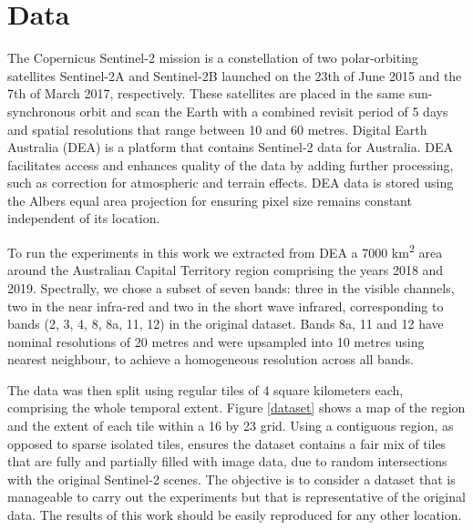 \documentclass[essd, manuscript]{copernicus}
\begin{document}
\section{Data}

The Copernicus Sentinel-2 mission \citep{drusch2012sentinel} is a constellation of two polar-orbiting satellites Sentinel-2A and Sentinel-2B launched on the 23th of June 2015 and the 7th of March 2017, respectively. These satellites are placed in the same sun-synchronous orbit and scan the Earth with a combined revisit period of 5 days and spatial resolutions that range between 10 and 60 metres. Digital Earth Australia (DEA) \citep{dhu2017digital} is a platform that contains Sentinel-2 data for Australia. DEA facilitates access and enhances quality of the data by adding further processing, such as correction for atmospheric and terrain effects. DEA data is stored using the Albers equal area projection for ensuring pixel size remains constant independent of its location.

To run the experiments in this work we extracted from DEA a 7000 km\textsuperscript{2} area around the Australian Capital Territory region comprising the years 2018 and 2019. Spectrally, we chose a subset of seven bands: three in the visible channels, two in the near infra-red and two in the short wave infrared, corresponding to bands (2, 3, 4, 8, 8a, 11, 12) in the original dataset. Bands 8a, 11 and 12 have nominal resolutions of 20 metres and were upsampled into 10 metres using nearest neighbour, to achieve a homogeneous resolution across all bands.

The data was then split using regular tiles of 4 square kilometers each, comprising the whole temporal extent. Figure \ref{dataset} shows a map of the region and the extent of each tile within a 16 by 23 grid. Using a contiguous region, as opposed to sparse isolated tiles, ensures the dataset contains a fair mix of tiles that are fully and partially filled with image data, due to random intersections with the original Sentinel-2 scenes. The objective is to consider a dataset that is manageable to carry out the experiments but that is representative of the original data. The results of this work should be easily reproduced for any other location.
\end{document}
